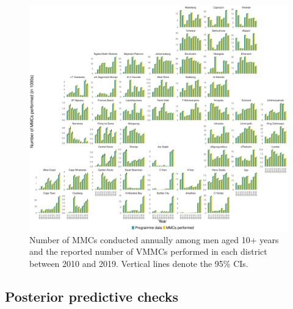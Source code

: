 \documentclass{article}
\begin{document}
\begin{appendix}

\begin{figure}[H]
	\centering
	\includegraphics[width = \linewidth]{Figures/suppmat/VMMCs/MMCsComparison_District}
	\caption{Number of MMCs conducted annually among men aged 10+ years and the reported number of VMMCs performed in each district between 2010 and 2019. Vertical lines denote the 95\% CIs.}
\end{figure}



\begin{landscape}
\subsection{Posterior predictive checks}



\end{landscape}
\end{appendix}
\end{document}
